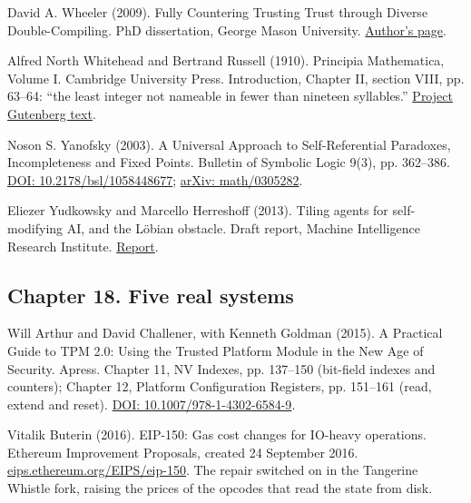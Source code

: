 \noindent David A. Wheeler (2009). Fully Countering Trusting Trust through Diverse Double-Compiling. PhD dissertation, George Mason University. \href{https://dwheeler.com/trusting-trust/}{Author's page}.
\par\medskip

\noindent Alfred North Whitehead and Bertrand Russell (1910). Principia Mathematica, Volume I. Cambridge University Press. Introduction, Chapter II, section VIII, pp. 63--64: ``the least integer not nameable in fewer than nineteen syllables.'' \href{https://www.gutenberg.org/ebooks/78050}{Project Gutenberg text}.
\par\medskip

\noindent Noson S. Yanofsky (2003). A Universal Approach to Self-Referential Paradoxes, Incompleteness and Fixed Points. Bulletin of Symbolic Logic 9(3), pp. 362--386. \href{https://doi.org/10.2178/bsl/1058448677}{DOI: 10.2178/bsl/1058448677}; \href{https://arxiv.org/abs/math/0305282}{arXiv: math/0305282}.
\par\medskip

\noindent Eliezer Yudkowsky and Marcello Herreshoff (2013). Tiling agents for self-modifying AI, and the L\"obian obstacle. Draft report, Machine Intelligence Research Institute. \href{https://intelligence.org/files/TilingAgentsDraft.pdf}{Report}.
\par\medskip

\subsection*{Chapter 18. Five real systems}

\noindent Will Arthur and David Challener, with Kenneth Goldman (2015). A Practical Guide to TPM 2.0: Using the Trusted Platform Module in the New Age of Security. Apress. Chapter 11, NV Indexes, pp. 137--150 (bit-field indexes and counters); Chapter 12, Platform Configuration Registers, pp. 151--161 (read, extend and reset). \href{https://doi.org/10.1007/978-1-4302-6584-9}{DOI: 10.1007/978-1-4302-6584-9}.
\par\medskip

\noindent Vitalik Buterin (2016). EIP-150: Gas cost changes for IO-heavy operations. Ethereum Improvement Proposals, created 24 September 2016. \href{https://eips.ethereum.org/EIPS/eip-150}{eips.ethereum.org/EIPS/eip-150}. The repair switched on in the Tangerine Whistle fork, raising the prices of the opcodes that read the state from disk.
\par\medskip

